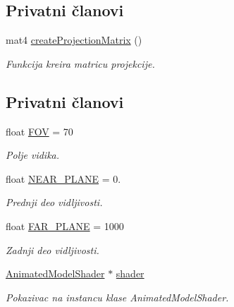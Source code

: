\subsection*{Privatni članovi}
\begin{DoxyCompactItemize}
\item 
mat4 \hyperlink{classcore_1_1AnimatedModelRenderer_a937c6ee9822091b28bbd33c7830070d1}{create\+Projection\+Matrix} ()
\begin{DoxyCompactList}\small\item\em Funkcija kreira matricu projekcije. \end{DoxyCompactList}\end{DoxyCompactItemize}
\subsection*{Privatni članovi}
\begin{DoxyCompactItemize}
\item 
float \hyperlink{classcore_1_1AnimatedModelRenderer_a6e6bdd3332f1444de611866c39820939}{F\+OV} = 70
\begin{DoxyCompactList}\small\item\em Polje vidika. \end{DoxyCompactList}\item 
float \hyperlink{classcore_1_1AnimatedModelRenderer_ae1866e112d319afa80dc143dca02e921}{N\+E\+A\+R\+\_\+\+P\+L\+A\+NE} = 0.
\begin{DoxyCompactList}\small\item\em Prednji deo vidljivosti. \end{DoxyCompactList}\item 
float \hyperlink{classcore_1_1AnimatedModelRenderer_a2266704b843367472fcb7cb56d17f3cf}{F\+A\+R\+\_\+\+P\+L\+A\+NE} = 1000
\begin{DoxyCompactList}\small\item\em Zadnji deo vidljivosti. \end{DoxyCompactList}\item 
\hyperlink{classshader_1_1AnimatedModelShader}{Animated\+Model\+Shader} $\ast$ \hyperlink{classcore_1_1AnimatedModelRenderer_acb2349d2a687cead94b8538731cd436a}{shader}
\begin{DoxyCompactList}\small\item\em Pokazivac na instancu klase Animated\+Model\+Shader. \end{DoxyCompactList}\end{DoxyCompactItemize}


